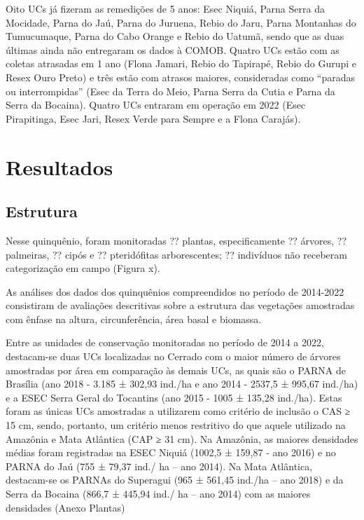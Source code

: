 \documentclass[
  letterpaper,
]{scrbook}
\begin{document}
Oito UCs já fizeram as remedições de 5 anos: Esec Niquiá, Parna Serra da
Mocidade, Parna do Jaú, Parna do Juruena, Rebio do Jaru, Parna Montanhas
do Tumucumaque, Parna do Cabo Orange e Rebio do Uatumã, sendo que as
duas últimas ainda não entregaram os dados à COMOB. Quatro UCs estão com
as coletas atrasadas em 1 ano (Flona Jamari, Rebio do Tapirapé, Rebio do
Gurupi e Resex Ouro Preto) e três estão com atrasos maiores,
consideradas como ``paradas ou interrompidas'' (Esec da Terra do Meio,
Parna Serra da Cutia e Parna da Serra da Bocaina). Quatro UCs entraram
em operação em 2022 (Esec Pirapitinga, Esec Jari, Resex Verde para
Sempre e a Flona Carajás).

\section{Resultados}\label{resultados}

\subsection{Estrutura}\label{estrutura}

Nesse quinquênio, foram monitoradas ?? plantas, especificamente ??
árvores, ?? palmeiras, ?? cipós e ?? pteridófitas arborescentes; ??
indivíduos não receberam categorização em campo (Figura x).

As análises dos dados dos quinquênios compreendidos no período de
2014-2022 consistiram de avaliações descritivas sobre a estrutura das
vegetações amostradas com ênfase na altura, circunferência, área basal e
biomassa.

Entre as unidades de conservação monitoradas no período de 2014 a 2022,
destacam-se duas UCs localizadas no Cerrado com o maior número de
árvores amostradas por área em comparação às demais UCs, as quais são o
PARNA de Brasília (ano 2018 - 3.185 ± 302,93 ind./ha e ano 2014 - 2537,5
± 995,67 ind./ha) e a ESEC Serra Geral do Tocantins (ano 2015 - 1005 ±
135,28 ind./ha). Estas foram as únicas UCs amostradas a utilizarem como
critério de inclusão o CAS ≥ 15 cm, sendo, portanto, um critério menos
restritivo do que aquele utilizado na Amazônia e Mata Atlântica (CAP ≥
31 cm). Na Amazônia, as maiores densidades médias foram registradas na
ESEC Niquiá (1002,5 ± 159,87 - ano 2016) e no PARNA do Jaú (755 ± 79,37
ind./ ha -- ano 2014). Na Mata Atlântica, destacam-se os PARNAs do
Superagui (965 ± 561,45 ind./ha -- ano 2018) e da Serra da Bocaina
(866,7 ± 445,94 ind./ ha -- ano 2014) com as maiores densidades (Anexo
Plantas)
\end{document}
